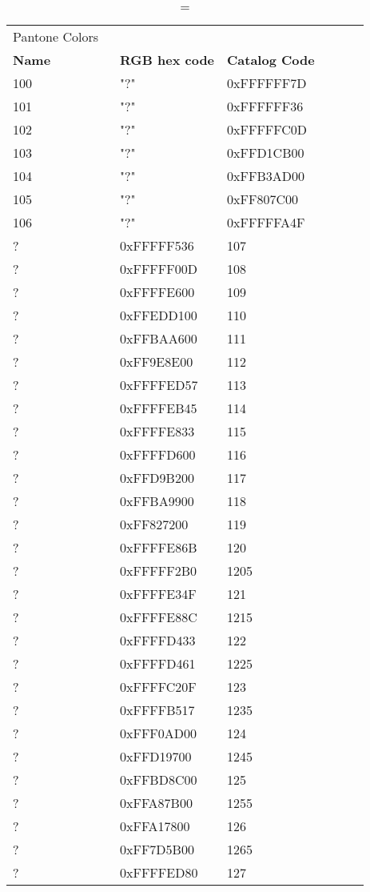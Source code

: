 
\begin{longtable}{p{0.3\linewidth} p{0.3\linewidth} p{0.4\linewidth}}
\caption = {Pantone Colors}
\label{tblr:pantone}\\
\textbf{Name} & \textbf{RGB hex code} & \textbf{Catalog Code} \\
100 &  "?" &  0xFFFFFF7D\\
101 &  "?" &  0xFFFFFF36\\
102 &  "?" &  0xFFFFFC0D\\
103 &  "?" &  0xFFD1CB00\\
104 &  "?" &  0xFFB3AD00\\
105 &  "?" &  0xFF807C00\\
106 &  "?" &  0xFFFFFA4F\\
? &  0xFFFFF536 &  107\\
? &  0xFFFFF00D &  108\\
? &  0xFFFFE600 &  109\\
? &  0xFFEDD100 &  110\\
? &  0xFFBAA600 &  111\\
? &  0xFF9E8E00 &  112\\
? &  0xFFFFED57 &  113\\
? &  0xFFFFEB45 &  114\\
? &  0xFFFFE833 &  115\\
? &  0xFFFFD600 &  116\\
? &  0xFFD9B200 &  117\\
? &  0xFFBA9900 &  118\\
? &  0xFF827200 &  119\\
? &  0xFFFFE86B &  120\\
? &  0xFFFFF2B0 &  1205\\
? &  0xFFFFE34F &  121\\
? &  0xFFFFE88C &  1215\\
? &  0xFFFFD433 &  122\\
? &  0xFFFFD461 &  1225\\
? &  0xFFFFC20F &  123\\
? &  0xFFFFB517 &  1235\\
? &  0xFFF0AD00 &  124\\
? &  0xFFD19700 &  1245\\
? &  0xFFBD8C00 &  125\\
? &  0xFFA87B00 &  1255\\
? &  0xFFA17800 &  126\\
? &  0xFF7D5B00 &  1265\\
? &  0xFFFFED80 &  127\\

\end{longtable}
